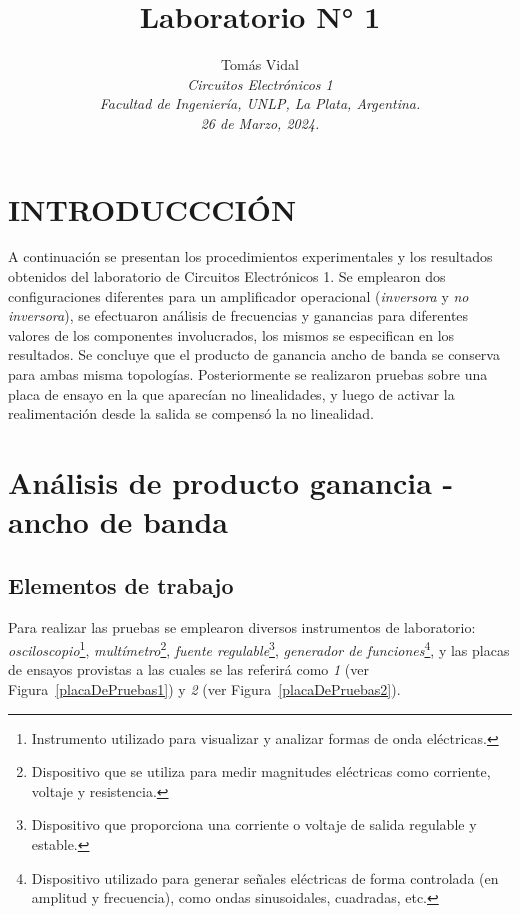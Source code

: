 \documentclass[letterpaper, 10 pt, conference]{ieeeconf}  %
\title{\LARGE \bf Laboratorio N° 1}
\author{
  Tom\'as Vidal\\
  {\it Circuitos Electrónicos 1}\\
  {\it Facultad de Ingenier\'ia, UNLP, La Plata, Argentina.}\\
  {\it 26 de Marzo, 2024.}
}                                            %
\begin{document}
\maketitle
\thispagestyle{empty}
\pagestyle{empty}

\section{INTRODUCCCI\'ON}
A continuación se presentan los procedimientos experimentales y los resultados obtenidos del laboratorio de Circuitos Electrónicos 1. Se emplearon dos configuraciones diferentes para un amplificador operacional (\textit{inversora} y \textit{no inversora}), se efectuaron análisis de frecuencias y ganancias para diferentes valores de los componentes involucrados, los mismos se especifican en los resultados. Se concluye que el producto de ganancia ancho de banda se conserva para ambas misma topologías. Posteriormente se realizaron pruebas sobre una placa de ensayo en la que aparecían no linealidades, y luego de activar la realimentación desde la salida se compensó la no linealidad.

\section{Análisis de producto ganancia - ancho de banda}
\subsection{Elementos de trabajo}
Para realizar las pruebas se emplearon diversos instrumentos de laboratorio: \textit{osciloscopio}\footnote{Instrumento utilizado para visualizar y analizar formas de onda eléctricas.}, \textit{multímetro}\footnote{Dispositivo que se utiliza para medir magnitudes eléctricas como corriente, voltaje y resistencia.}, \textit{fuente regulable}\footnote{Dispositivo que proporciona una corriente o voltaje de salida regulable y estable.}, \textit{generador de funciones}\footnote{Dispositivo utilizado para generar señales eléctricas de forma controlada (en amplitud y frecuencia), como ondas sinusoidales, cuadradas, etc.}, y las placas de ensayos provistas a las cuales se las referirá como \textit{1} (ver Figura~\ref{placaDePruebas1}) y \textit{2} (ver Figura~\ref{placaDePruebas2}).
\end{document}
